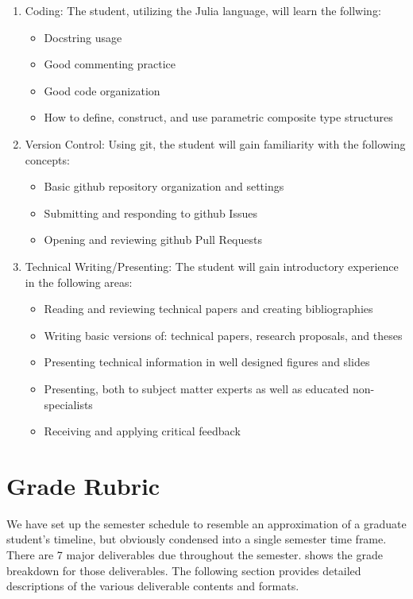 \documentclass[12pt]{article}
\begin{document}
\begin{enumerate}
	\item Coding: The student, utilizing the Julia language, will learn the follwing:
	\begin{itemize}
		\item Docstring usage
		\item Good commenting practice
		\item Good code organization
		\item How to define, construct, and use parametric composite type structures
	\end{itemize}
	\item Version Control: Using git, the student will gain familiarity with the following concepts:
	\begin{itemize}
		\item Basic github repository organization and settings
		\item Submitting and responding to github Issues
		\item Opening and reviewing github Pull Requests
	\end{itemize}
	\item Technical Writing/Presenting: The student will gain introductory experience in the following areas:
	\begin{itemize}
		\item Reading and reviewing technical papers and creating bibliographies
		\item Writing basic versions of: technical papers, research proposals, and theses
		\item Presenting technical information in well designed figures and slides
		\item Presenting, both to subject matter experts as well as educated non-specialists
		\item Receiving and applying critical feedback
	\end{itemize}
\end{enumerate}





\section{Grade Rubric}
\label{sec:graderubric}

We have set up the semester schedule to resemble an approximation of a graduate student's timeline, but obviously condensed into a single semester time frame.
There are 7 major deliverables due throughout the semester.
 shows the grade breakdown for those deliverables.
The following section provides detailed descriptions of the various deliverable contents and formats.
\end{document}
